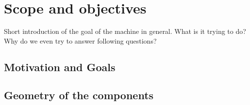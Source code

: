 \section{Scope and objectives}
{\color{greenColor}\itshape

	Short introduction of the goal of the machine in general. What is it trying to do? Why do we even try to answer following questions?
}
\subsection{Motivation and Goals}

\newpage

\subsection{Geometry of the components}

\newpage
